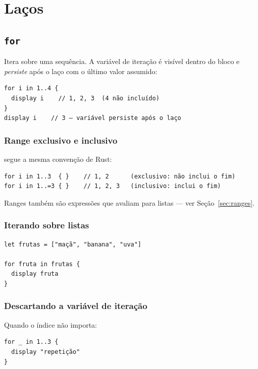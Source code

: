\chapter{Laços}

\section{\texttt{for}}

Itera sobre uma sequência. A variável de iteração é visível dentro do bloco e
\textit{persiste} após o laço com o último valor assumido:

\begin{lstlisting}[caption={for sobre range}]
for i in 1..4 {
  display i    // 1, 2, 3  (4 não incluído)
}
display i    // 3 — variável persiste após o laço
\end{lstlisting}

\subsection*{Range exclusivo e inclusivo}

\hayashi{} segue a mesma convenção de Rust:

\begin{lstlisting}
for i in 1..3  { }    // 1, 2      (exclusivo: não inclui o fim)
for i in 1..=3 { }    // 1, 2, 3   (inclusivo: inclui o fim)
\end{lstlisting}

Ranges também são expressões que avaliam para listas — ver Seção~\ref{sec:ranges}.

\subsection*{Iterando sobre listas}

\begin{lstlisting}
let frutas = ["maçã", "banana", "uva"]

for fruta in frutas {
  display fruta
}
\end{lstlisting}

\subsection*{Descartando a variável de iteração}

Quando o índice não importa:

\begin{lstlisting}
for _ in 1..3 {
  display "repetição"
}
\end{lstlisting}

